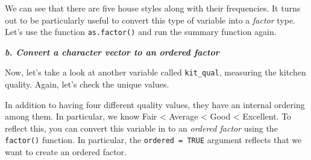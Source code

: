 \documentclass[
]{book}
\newenvironment{Shaded}{\begin{snugshade}}{\end{snugshade}}
\newcommand{\AttributeTok}[1]{\textcolor[rgb]{0.77,0.63,0.00}{#1}}
\newcommand{\CommentTok}[1]{\textcolor[rgb]{0.56,0.35,0.01}{\textit{#1}}}
\newcommand{\ConstantTok}[1]{\textcolor[rgb]{0.00,0.00,0.00}{#1}}
\newcommand{\FunctionTok}[1]{\textcolor[rgb]{0.00,0.00,0.00}{#1}}
\newcommand{\NormalTok}[1]{#1}
\newcommand{\OtherTok}[1]{\textcolor[rgb]{0.56,0.35,0.01}{#1}}
\newcommand{\SpecialCharTok}[1]{\textcolor[rgb]{0.00,0.00,0.00}{#1}}
\newcommand{\StringTok}[1]{\textcolor[rgb]{0.31,0.60,0.02}{#1}}
\begin{document}
We can see that there are five house styles along with their frequencies. It turns out to be particularly useful to convert this type of variable into a \emph{factor} type. Let's use the function \texttt{as.factor()} and run the summary function again.

\begin{Shaded}
\end{Shaded}

\textbf{\emph{b. Convert a character vector to an ordered factor}}

Now, let's take a look at another variable called \texttt{kit\_qual}, measuring the kitchen quality. Again, let's check the unique values.

\begin{Shaded}
\end{Shaded}

In addition to having four different quality values, they have an internal ordering among them. In particular, we know Fair \textless{} Average \textless{} Good \textless{} Excellent. To reflect this, you can convert this variable in to an \emph{ordered factor} using the \texttt{factor()} function. In particular, the \texttt{ordered\ =\ TRUE} argument reflects that we want to create an ordered factor.

\begin{Shaded}
\end{Shaded}
\end{document}
